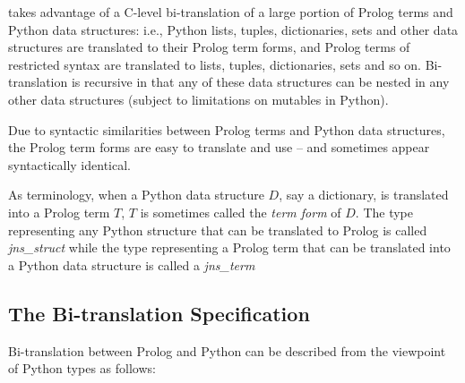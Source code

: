 \janus{} takes advantage of a C-level bi-translation of a large
portion of Prolog terms and Python data structures: i.e., Python
lists, tuples, dictionaries, sets and other data structures are
translated to their Prolog term forms, and Prolog terms of restricted
syntax are translated to lists, tuples, dictionaries, sets and so on.
Bi-translation is recursive in that any of these data structures can
be nested in any other data structures (subject to limitations on
mutables in Python).
     
Due to syntactic similarities between Prolog terms and Python data
structures, the Prolog term forms are easy to translate and use -- and
sometimes appear syntactically identical.

%
As terminology, when a Python data structure $D$, say a dictionary, is
translated into a Prolog term $T$, $T$ is sometimes called the {\em
  term form} of $D$.  The type representing any Python structure that
can be translated to Prolog is called {\em jns\_struct} while the type
representing a Prolog term that can be translated into a Python data
structure is called a {\em jns\_term}

\subsection{The Bi-translation Specification} \label{sec-bi-translation}

Bi-translation between Prolog and Python can be described from the
viewpoint of Python types as follows:


